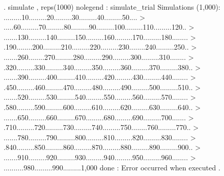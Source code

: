 . simulate , reps(1000) nolegend : simulate_trial
{\smallskip}
Simulations (1,000): .........10.........20.........30.........40.........50....
> .....60.........70.........80.........90.........100.........110.........120..
> .......130.........140.........150.........160.........170.........180........
> .190.....{}...200.........210.........220.........230....{}....240.........250..
> .......260........{}270.........280.........290.........300.........310........
> .320.........330.........340.........350.........360.........370.........380..
> .......390.........400.........410.........420.........430.........440........
> .450.........460.........470.........480.........490.........500.........510..
> .......520.........530.........540.........550.........560.........570........
> .580.........590.........600.........610.........620.........630.........640..
> .......650.........660.........670.........680.........690.........700.......{}
> .710.........720.........730.........740.........750.......{}.760.........770..
> .......780.........790.........800.........810.........820.........830........
> .840.........850.........860.........870.........880.........890.........900..
> .......910.........920.........930.........940.........950.........960........
> .{}.........980.........990.........1,000 done
{}: Error occurred when {} executed {}.
